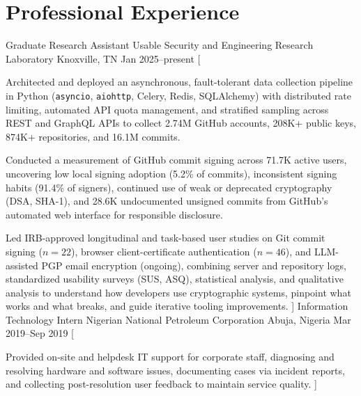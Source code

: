 


\section{Professional Experience}

\begin{experience}

	\job
		{Graduate Research Assistant}
		{Usable Security and Engineering Research Laboratory}
		{Knoxville, TN}
		{Jan 2025--present}
		[
			\item Architected and deployed an asynchronous, fault-tolerant data collection pipeline in Python (\texttt{asyncio}, \texttt{aiohttp}, Celery, Redis, SQLAlchemy) with distributed rate limiting, automated API quota management, and stratified sampling across REST and GraphQL APIs to collect 2.74M GitHub accounts, 208K+ public keys, 874K+ repositories, and 16.1M commits.
			\item Conducted a measurement of GitHub commit signing across 71.7K active users, uncovering low local signing adoption (5.2\% of commits), inconsistent signing habits (91.4\% of signers), continued use of weak or deprecated cryptography (DSA, SHA-1), and 28.6K undocumented unsigned commits from GitHub's automated web interface for responsible disclosure.
			\item Led IRB-approved longitudinal and task-based user studies on Git commit signing ($n=22$), browser client-certificate authentication ($n=46$), and LLM-assisted PGP email encryption (ongoing), combining server and repository logs, standardized usability surveys (SUS, ASQ), statistical analysis, and qualitative analysis to understand how developers use cryptographic systems, pinpoint what works and what breaks, and guide iterative tooling improvements.
		]
\job
		{Information Technology Intern}
		{Nigerian National Petroleum Corporation}
		{Abuja, Nigeria}
		{Mar 2019--Sep 2019}
		[
			\item Provided on-site and helpdesk IT support for corporate staff, diagnosing and resolving hardware and software issues, documenting cases via incident reports, and collecting post-resolution user feedback to maintain service quality.
		]

\end{experience}






































